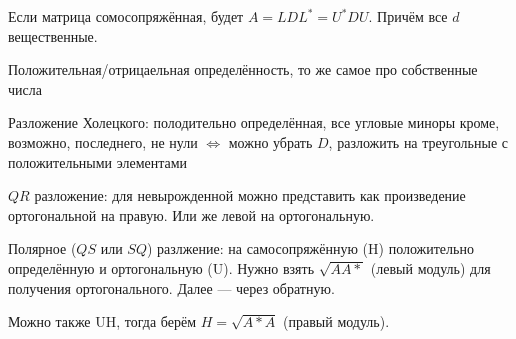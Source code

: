 \documentclass[12pt, a4paper]{article}
\begin{document}
    Если матрица сомосопряжённая, будет $A = LDL^* = U^*DU$. Причём все $d$ вещественные.

    Положительная/отрицаельная определённость, то же самое про собственные числа

    Разложение Холецкого: полодительно определённая, все угловые миноры кроме, возможно, последнего, не нули $\Longleftrightarrow$ можно убрать $D$, 
    разложить на треугольные с положительными элементами

    $QR$ разложение: для невырожденной можно представить как произведение ортогональной на правую. Или же левой на ортогональную.

    Полярное ($QS$ или $SQ$) разлжение: на самосопряжённую (H) положительно определённую и ортогональную (U). 
    Нужно взять $\sqrt{AA*}$ (левый модуль) для получения ортогонального. Далее — через обратную.

    Можно также UH, тогда берём $H = \sqrt{A*A}$ (правый модуль).
\end{document}
